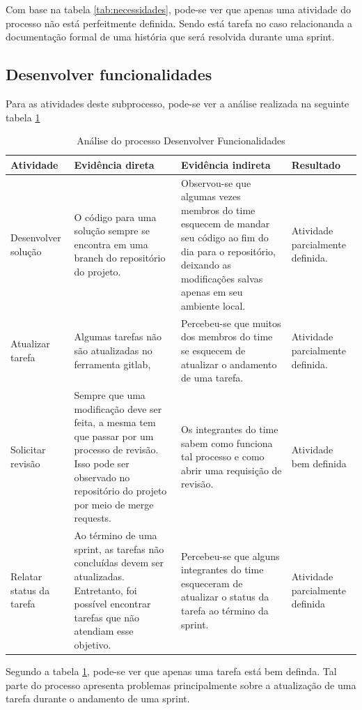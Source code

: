 \documentclass[a4paper, 11pt]{article}
\begin{document}
Com base na tabela \ref{tab:necessidades}, pode-se ver que apenas uma atividade
do processo não está perfeitmente definida. Sendo está tarefa no caso
relacionanda a documentação formal de uma história que será resolvida durante
uma sprint.

\subsection*{Desenvolver funcionalidades}

Para as atividades deste subprocesso, pode-se ver a análise realizada na
seguinte tabela \ref{tab:desenvolvimento}

\begin{table}[]
\centering
\caption{Análise do processo Desenvolver Funcionalidades}
\label{tab:desenvolvimento}
\begin{tabularx}{\textwidth}{|X|X|X|X|}
\hline
Atividade & Evidência direta & Evidência indireta & Resultado \\ \hline
Desenvolver solução & O código para uma solução sempre se encontra em uma branch do repositório do projeto. & Observou-se que algumas vezes membros do time esquecem de mandar seu código ao fim do dia para o repositório, deixando as modificações salvas apenas em seu ambiente local. & Atividade parcialmente definida. \\ \hline
Atualizar tarefa & Algumas tarefas não são atualizadas no ferramenta gitlab, & Percebeu-se que muitos dos membros do time se esquecem de atualizar o andamento de uma tarefa. & Atividade parcialmente definida. \\ \hline
Solicitar revisão & Sempre que uma modificação deve ser feita, a mesma tem que passar por um processo de revisão. Isso pode ser observado no repositório do projeto por meio de merge requests. & Os integrantes do time sabem como funciona tal processo e como abrir uma requisição de revisão. & Atividade bem definida \\ \hline
Relatar status da tarefa & Ao término de uma sprint, as tarefas não concluídas devem ser atualizadas. Entretanto, foi possível encontrar tarefas que não atendiam esse objetivo. & Percebeu-se que alguns integrantes do time esqueceram de atualizar o status da tarefa ao término da sprint. & Atividade parcialmente definida \\ \hline
\end{tabularx}
\end{table}

Segundo a tabela \ref{tab:desenvolvimento}, pode-se ver que apenas uma tarefa
está bem definda. Tal parte do processo apresenta problemas principalmente
sobre a atualização de uma tarefa durante o andamento de uma sprint.
\end{document}
